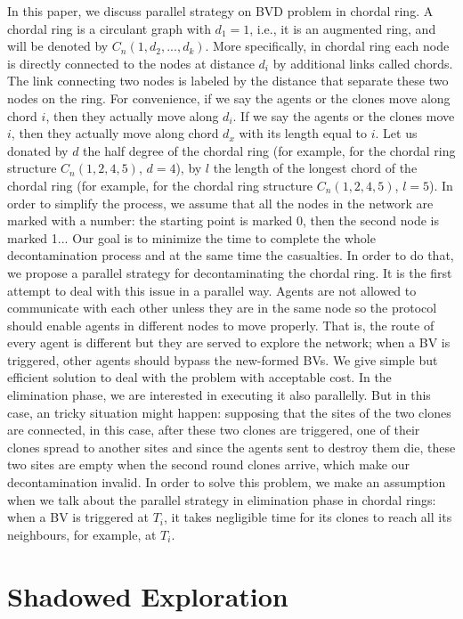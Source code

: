 \documentclass[conference]{IEEEtran}
\begin{document}
In this paper, we discuss parallel strategy on BVD problem in chordal ring. A chordal ring is a circulant graph with $d_1=1$, i.e., it is an augmented ring, and will be denoted by $C_n(1, d_2, ..., d_k)$. More specifically, in chordal ring each node is directly connected to the nodes at distance $d_i$ by additional links called chords. The link connecting two nodes is labeled by the distance that separate these two nodes on the ring. 
For convenience, if we say the agents or the clones move along chord $i$, then they actually move along $d_i$. If we say the agents or the clones move $i$, then they actually move along chord $d_x$ with its length equal to $i$. Let us donated by $d$ the half degree of the chordal ring (for example, for the chordal ring structure $C_n(1,2,4,5)$, $d=4$), by $l$ the length of the longest chord of the chordal ring (for example, for the chordal ring structure $C_n(1,2,4,5)$, $l=5$). In order to simplify the process, we assume that all the nodes in the network are marked with a number: the starting point is marked 0, then the second node is marked 1... Our goal is to minimize the time to complete the whole decontamination process and at the same time the casualties. In order to do that, we propose a parallel strategy for decontaminating the chordal ring. It is the first attempt to deal with this issue in a parallel way. Agents are not allowed to communicate with each other unless they are in the same node so the protocol should enable agents in different nodes to move properly. That is, the route of every agent is different but they are served to explore the network; when a BV is triggered, other agents should bypass the new-formed BVs. We give simple but efficient solution to deal with the problem with acceptable cost. 
In the elimination phase, we are interested in executing it also parallelly. But in this case, an tricky situation might happen: supposing that the sites of the two clones are connected, in this case, after these two clones are triggered, one of their clones spread to another sites and since the agents sent to destroy them die, these two sites are empty when the second round clones arrive, which make our decontamination invalid. In order to solve this problem, we make an assumption when we talk about the parallel strategy in elimination phase in chordal rings: when a BV is triggered at $T_i$, it takes negligible time for its clones to reach all its neighbours, for example, at $T_i$.  

\section{Shadowed Exploration}
\end{document}
